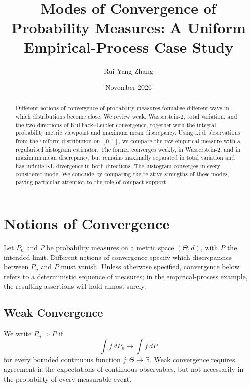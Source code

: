 \documentclass[
  11pt,
  a4paper,
  notitlepage
]{report}
\title{Modes of Convergence of Probability Measures:
A Uniform Empirical-Process Case Study}
\author{Rui-Yang Zhang}
\date{November 2026}
\makeatletter
\renewcommand{\tableofcontents}{%
  \section*{\contentsname}%
  \@starttoc{toc}%
}
\makeatother
\begin{document}
\maketitle


\begin{abstract}
Different notions of convergence of probability measures formalise
different ways in which distributions become close. We review weak,
Wasserstein-2, total variation, and the two directions of
Kullback--Leibler convergence, together with the integral probability
metric viewpoint and maximum mean discrepancy. Using i.i.d. observations
from the uniform distribution on $[0,1]$, we compare the raw empirical
measure with a regularised histogram estimator. The former converges
weakly, in Wasserstein-2, and in maximum mean discrepancy, but remains
maximally separated in total variation and has infinite KL divergence in
both directions. The histogram converges in every considered mode. We
conclude by comparing the relative strengths of these modes, paying
particular attention to the role of compact support.
\end{abstract}


\vspace{0.5em}
\tableofcontents


\chapter{Notions of Convergence}\label{notions-of-convergence}

Let \(P_n\) and \(P\) be probability measures on a metric space
\((\Theta,d)\), with \(P\) the intended limit. Different notions of
convergence specify which discrepancies between \(P_n\) and \(P\) must
vanish. Unless otherwise specified, convergence below refers to a
deterministic sequence of measures; in the empirical-process example,
the resulting assertions will hold almost surely.

\section{Weak Convergence}\label{weak-convergence}

We write \(P_n\Rightarrow P\) if \[
\int f\,dP_n\longrightarrow\int f\,dP
\] for every bounded continuous function \(f:\Theta\to\mathbb R\). Weak
convergence requires agreement in the expectations of continuous
observables, but not necessarily in the probability of every measurable
event.
\end{document}
